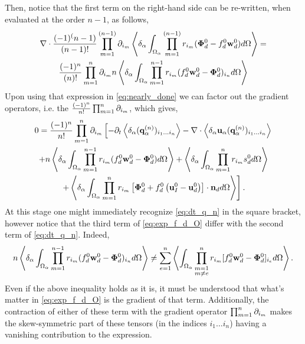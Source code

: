 Then, notice that the first term on the right-hand side can be re-written, when evaluated at the order $n-1$, as follows,
\begin{multline*}
    \div \expo[(n-1)]{(\bm\Phi_d^0 - f_d^0 \textbf{w}_d^0)}
    = \\
    \frac{(-1)^{n}}{{(n)}!} \partialp{1}{n}  n \pOavg{ \pri{1}{n-1}(f_d^0 \textbf{w}_d^0 - \bm\Phi_d^0)_{i_{n}} }
\end{multline*} 
Upon using that expression in \ref{eq:nearly_done} we can factor out the gradient operators, i.e. the $\frac{(-1)^n}{n!} \partialp{1}{n}$, which gives, 
\begin{multline}
    0 = \frac{(-1)^n}{n!}
    \partialp{1}{n}
    \left[
        - \partial_t
        \pavg{(\textbf{q}_\alpha^{(n)})_{i_1\ldots i_n}}
        - \div \pavg{\textbf{u}_\alpha (\textbf{q}_\alpha^{(n)})_{i_1\ldots i_n}}
    \right.\\\left.
        +n\pavg{\int_{\Omega_\alpha} \pri{1}{n-1} (f_d^0 \textbf{w}_d^0-\bm\Phi_d^0) d\Omega}
        +\pavg{\int_{\Omega_\alpha} \pri{1}{n} s_d^0 d\Omega}
        \right.\\\left.
        +\pavg{\int_{\Omega_\alpha} \pri{1}{n} \left[
            \bm\Phi_d^0
            + f_d^0
            \left(
                \textbf{u}_I^0
                - \textbf{u}_d^0
            \right)
        \right]
        \cdot \textbf{n}_d d\Omega}
    \right].
    \label{eq:exp_f_d_O}
\end{multline}
At this stage one might immediately recognize \ref{eq:dt_q_n} in the square bracket, however notice that the third term of \ref{eq:exp_f_d_O} differ with the second term of \ref{eq:dt_q_n}. 
Indeed, 
\begin{equation*}
    n\pavg{\int_{\Omega_\alpha} \pri{1}{n-1} ( f_d^0 \textbf{w}_d^0-\bm\Phi_d^0)_{i_n} d\Omega}
    \neq
    \sum_{e=1}^{n} 
    \avg{
        \intO{
        \prod^{n}_{\substack{ m=1 \\m \neq e}} r_{i_m} [f_d^0 \textbf{w}_d^0  - \bm\Phi_d^0]_{i_e}
        }
    }. 
    \label{eq:ineq_which_does_not_make_sens}
\end{equation*}
Even if the above inequality holds as it is, it must be understood that what's matter in \ref{eq:exp_f_d_O} is the gradient of that term. 
Additionally, the contraction of either of these term with the gradient operator $\partialp{1}{n}$ makes the skew-symmetric part of these tensors (in the indices $i_1\ldots i_n$) having a vanishing contribution to the expression.
